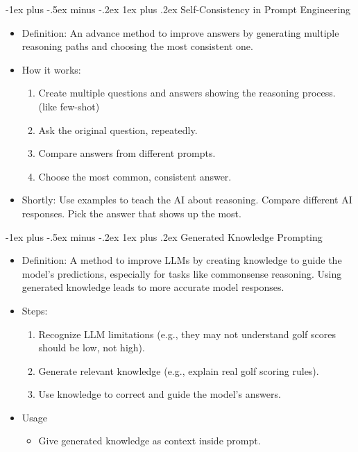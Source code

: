 \documentclass[10pt,landscape]{article}
\makeatletter
\renewcommand{\subsection}{\@startsection{subsection}{2}{0mm}%
                                {-1explus -.5ex minus -.2ex}%
                                {0.5ex plus .2ex}%
                                {\normalfont\normalsize\bfseries}}
\renewcommand{\subsection}{\@startsection{subsection}{3}{0mm}%
                                {-1ex plus -.5ex minus -.2ex}%
                                {1ex plus .2ex}%
                                {\normalfont\small\bfseries}}
\makeatother
\begin{document}
\begin{multicols}{3}
\subsection{Self-Consistency in Prompt Engineering}
\begin{itemize}
    \item Definition: An advance method to improve answers by generating multiple reasoning paths and choosing the most consistent one.
    \item How it works:
    \begin{enumerate}
        \item Create multiple questions and answers showing the reasoning process. (like few-shot)
        \item Ask the original question, repeatedly.
        \item Compare answers from different prompts.
        \item Choose the most common, consistent answer.
    \end{enumerate}
    \item Shortly: Use examples to teach the AI about reasoning. Compare different AI responses. Pick the answer that shows up the most.
\end{itemize}

\subsection{Generated Knowledge Prompting}
\begin{itemize}
    \item Definition: A method to improve LLMs by creating knowledge to guide the model's predictions, especially for tasks like commonsense reasoning. Using generated knowledge leads to more accurate model responses.
    \item Steps:
    \begin{enumerate}
        \item Recognize LLM limitations (e.g., they may not understand golf scores should be low, not high).
        \item Generate relevant knowledge (e.g., explain real golf scoring rules).
        \item Use knowledge to correct and guide the model's answers.
    \end{enumerate}
    \item Usage
    \begin{itemize}
        \item Give generated knowledge as context inside prompt.
    \end{itemize}
\end{itemize}


\end{multicols}
\end{document}
